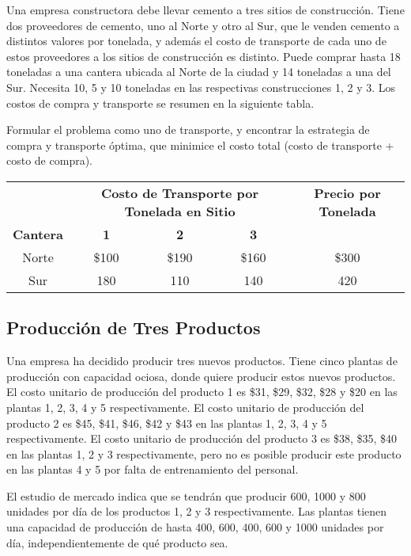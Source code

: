 \documentclass[12pt]{article}
\begin{document}
Una empresa constructora debe llevar cemento a tres sitios de construcción. Tiene dos proveedores de cemento, uno al Norte y otro al Sur, que le venden cemento a distintos valores por tonelada, y además el costo de transporte de cada uno de estos proveedores a los sitios de construcción es distinto. Puede comprar hasta 18 toneladas a una cantera ubicada al Norte de la ciudad y 14 toneladas a una del Sur. Necesita 10, 5 y 10 toneladas en las respectivas construcciones 1, 2 y 3. Los costos de compra y transporte se resumen en la siguiente tabla.

Formular el problema como uno de transporte, y encontrar la estrategia de compra y transporte óptima, que minimice el costo total (costo de transporte + costo de compra).

\begin{center}
\begin{tabular}{c|ccc|c}
\toprule
& \multicolumn{3}{c|}{\textbf{Costo de Transporte por Tonelada en Sitio}} & \textbf{Precio por Tonelada} \\
\cmidrule(lr){2-4} 
\textbf{Cantera} & \textbf{1} & \textbf{2} & \textbf{3} & \\
\midrule
Norte & \$100 & \$190 & \$160 & \$300 \\
Sur & 180 & 110 & 140 & 420 \\
\bottomrule
\end{tabular}
\end{center}

\subsection{Producción de Tres Productos}

Una empresa ha decidido producir tres nuevos productos. Tiene cinco plantas de producción con capacidad ociosa, donde quiere producir estos nuevos productos. El costo unitario de producción del producto 1 es \$31, \$29, \$32, \$28 y \$20 en las plantas 1, 2, 3, 4 y 5 respectivamente. El costo unitario de producción del producto 2 es \$45, \$41, \$46, \$42 y \$43 en las plantas 1, 2, 3, 4 y 5 respectivamente. El costo unitario de producción del producto 3 es \$38, \$35, \$40 en las plantas 1, 2 y 3 respectivamente, pero no es posible producir este producto en las plantas 4 y 5 por falta de entrenamiento del personal.

El estudio de mercado indica que se tendrán que producir 600, 1000 y 800 unidades por día de los productos 1, 2 y 3 respectivamente. Las plantas tienen una capacidad de producción de hasta 400, 600, 400, 600 y 1000 unidades por día, independientemente de qué producto sea.
\end{document}

